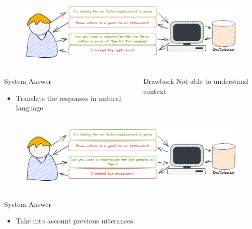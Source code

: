 \documentclass[10pt,aspectratio=169]{beamer}
\begin{document}
\begin{frame}
    \begin{figure}[t]
        \centering
        \includegraphics[width=.9\textwidth]{media/task-dial-4.png}
    \end{figure}
    \begin{columns}
        \begin{column}{0.5\textwidth}
            \begin{block}{System Answer}
                \begin{itemize}
                    \item Translate the responses in natural language
                \end{itemize}
            \end{block}
        \end{column}
        \begin{column}{0.5\textwidth}
            \begin{alertblock}{Drawback}
               Not able to understand context
            \end{alertblock}
        \end{column}
    \end{columns}
\end{frame}
\begin{frame}
    \begin{figure}[t]
        \centering
        \includegraphics[width=.9\textwidth]{media/task-dial-5.png}
    \end{figure}
    \begin{columns}
        \begin{column}{0.5\textwidth}
            \begin{block}{System Answer}
                \begin{itemize}
                    \item Take into account previous utterances
                \end{itemize}
            \end{block}
        \end{column}

    \end{columns}
\end{frame}
\end{document}
